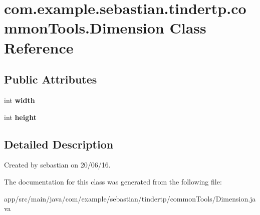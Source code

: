 \hypertarget{classcom_1_1example_1_1sebastian_1_1tindertp_1_1commonTools_1_1Dimension}{}\section{com.\+example.\+sebastian.\+tindertp.\+common\+Tools.\+Dimension Class Reference}
\label{classcom_1_1example_1_1sebastian_1_1tindertp_1_1commonTools_1_1Dimension}
\subsection*{Public Attributes}
\begin{DoxyCompactItemize}
\item 
int {\bfseries width}\hypertarget{classcom_1_1example_1_1sebastian_1_1tindertp_1_1commonTools_1_1Dimension_a5d1f377e789d679450f75eac8fd5ce12}{}\label{classcom_1_1example_1_1sebastian_1_1tindertp_1_1commonTools_1_1Dimension_a5d1f377e789d679450f75eac8fd5ce12}

\item 
int {\bfseries height}\hypertarget{classcom_1_1example_1_1sebastian_1_1tindertp_1_1commonTools_1_1Dimension_a4ee29bcdd83baba61cca9f9be8bc93c3}{}\label{classcom_1_1example_1_1sebastian_1_1tindertp_1_1commonTools_1_1Dimension_a4ee29bcdd83baba61cca9f9be8bc93c3}

\end{DoxyCompactItemize}


\subsection{Detailed Description}
Created by sebastian on 20/06/16. 

The documentation for this class was generated from the following file\+:\begin{DoxyCompactItemize}
\item 
app/src/main/java/com/example/sebastian/tindertp/common\+Tools/Dimension.\+java\end{DoxyCompactItemize}
